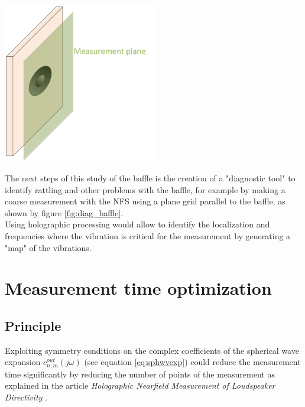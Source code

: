 \documentclass{report}
\begin{document}
\begin{minipage}{0.4\textwidth}
\begin{center}
	\includegraphics[width=0.5\textwidth]{GridOpti/meas_rattling} 
    \captionsetup{hypcap=false} 
	\label{fig:diag_baffle}
\end{center}
\end{minipage}
\begin{minipage}{0.6\textwidth}
The next steps of this study of the baffle is the creation of a "diagnostic tool" to identify rattling and other problems with the baffle, for example by making a coarse measurement with the NFS using a plane grid parallel to the baffle, as shown by figure \ref{fig:diag_baffle}.\\
Using holographic processing would allow to identify the localization and frequencies where the vibration is critical for the measurement by generating a "map" of the vibrations.
\end{minipage}



\chapter{Measurement time optimization}

\section{Principle}


Exploiting symmetry conditions on the complex coefficients of the spherical wave expansion $c_{n,m}^{out}(j \omega)$ (see equation \ref{eq:sphwvexp}) could reduce the measurement time significantly by reducing the number of points of the measurement as explained in the article \textit{Holographic Nearfield Measurement of Loudspeaker Directivity} \citep[][sect.~4]{aeshs}. \\
\end{document}
